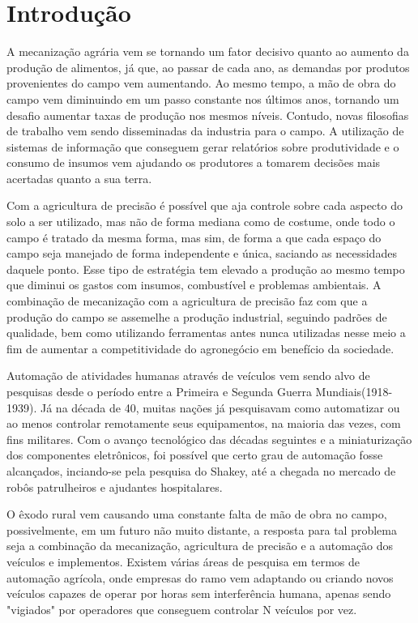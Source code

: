 \chapter{Introdução}
\label{cap:introducao}

A mecanização agrária vem se tornando um fator decisivo quanto ao aumento da produção de alimentos, já que, ao passar de cada ano, as demandas por produtos provenientes do campo vem aumentando. Ao mesmo tempo, a mão de obra do campo vem diminuindo em um passo constante nos últimos anos, tornando um desafio aumentar taxas de produção nos mesmos níveis. Contudo, novas filosofias de trabalho vem sendo disseminadas da industria para o campo. A utilização de sistemas de informação que conseguem gerar relatórios sobre produtividade e o consumo de insumos vem ajudando os produtores a tomarem decisões mais acertadas quanto a sua terra. 

Com a agricultura de precisão é possível que aja controle sobre cada aspecto do solo a ser utilizado, mas não de forma mediana como de costume, onde todo o campo é tratado da mesma forma, mas sim, de forma a que cada espaço do campo seja manejado de forma independente e única, saciando as necessidades daquele ponto. Esse tipo de estratégia tem elevado a produção ao mesmo tempo que diminui os gastos com insumos, combustível e problemas ambientais. A combinação de mecanização com a agricultura de precisão faz com que a produção do campo se assemelhe a produção industrial, seguindo padrões de qualidade, bem como utilizando ferramentas antes nunca utilizadas nesse meio a fim de aumentar a competitividade do agronegócio em benefício da sociedade\cite{Viana2009}.

Automação de atividades humanas através de veículos vem sendo alvo de pesquisas desde o período entre a Primeira e Segunda Guerra Mundiais(1918-1939). Já na década de 40, muitas nações já pesquisavam como automatizar ou ao menos controlar remotamente seus equipamentos, na maioria das vezes, com fins militares. Com o avanço tecnológico das décadas seguintes e a miniaturização dos componentes eletrônicos, foi possível que certo grau de automação fosse alcançados, inciando-se pela pesquisa do Shakey\cite{cassel:2017}, até a chegada no mercado de robôs patrulheiros e ajudantes hospitalares.

O êxodo rural vem causando uma constante falta de mão de obra no campo, possivelmente, em um futuro não muito distante, a resposta para tal problema seja a combinação da mecanização, agricultura de precisão e a automação dos veículos e implementos. Existem várias áreas de pesquisa em termos de automação agrícola, onde empresas do ramo vem adaptando ou criando novos veículos capazes de operar por horas sem interferência humana, apenas sendo "vigiados" por operadores que conseguem controlar N veículos por vez.

